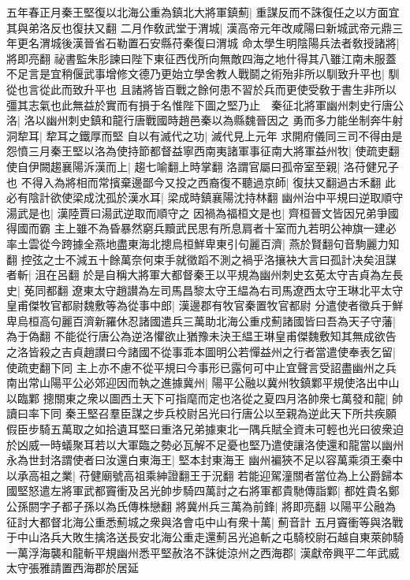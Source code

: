五年春正月秦王堅復以北海公重為鎮北大將軍鎮薊|{
	重謀反而不誅復任之以方面宜其與弟洛反也復扶又翻}
二月作敎武堂于渭城|{
	漢高帝元年改咸陽曰新城武帝元鼎三年更名渭城後漢晉省石勒置石安縣苻秦復曰渭城}
命太學生明陰陽兵法者敎授諸將|{
	將即亮翻}
祕書監朱肜諫曰陛下東征西伐所向無敵四海之地什得其八雖江南未服蓋不足言是宜稍偃武事增修文德乃更始立學舍教人戰鬬之術殆非所以馴致升平也|{
	馴從也言從此而致升平也}
且諸將皆百戰之餘何患不習於兵而更使受敎于書生非所以彊其志氣也此無益於實而有損于名惟陛下圖之堅乃止　秦征北將軍幽州刺史行唐公洛|{
	洛以幽州刺史鎮和龍行唐戰國時趙邑秦以為縣魏晉因之}
勇而多力能坐制奔牛射洞犂耳|{
	犂耳之鐵厚而堅}
自以有滅代之功|{
	滅代見上元年}
求開府儀同三司不得由是怨憤三月秦王堅以洛為使持節都督益寧西南夷諸軍事征南大將軍益州牧|{
	使疏吏翻}
使自伊闕趨襄陽泝漢而上|{
	趨七喻翻上時掌翻}
洛謂官屬曰孤帝室至親|{
	洛苻健兄子也}
不得入為將相而常擯棄邊鄙今又投之西裔復不聽過京師|{
	復扶又翻過古禾翻}
此必有陰計欲使梁成沈孤於漢水耳|{
	梁成時鎮襄陽沈持林翻}
幽州治中平規曰逆取順守湯武是也|{
	漢陸賈曰湯武逆取而順守之}
因禍為福桓文是也|{
	齊桓晉文皆因兄弟爭國得國而霸}
主上雖不為昏暴然窮兵黷武民思有所息肩者十室而九若明公神旗一建必率土雲從今跨據全燕地盡東海北摠烏桓鮮卑東引句麗百濟|{
	燕於賢翻句音駒麗力知翻}
控弦之士不減五十餘萬奈何束手就徵蹈不測之禍乎洛攘袂大言曰孤計决矣沮謀者斬|{
	沮在呂翻}
於是自稱大將軍大都督秦王以平規為幽州刺史玄莬太守吉貞為左長史|{
	莬同都翻}
遼東太守趙讃為左司馬昌黎太守王緼為右司馬遼西太守王琳北平太守皇甫傑牧官都尉魏敷等為從事中郎|{
	漢邊郡有牧官秦置牧官都尉}
分遣使者徵兵于鮮卑烏桓高句麗百濟新羅休忍諸國遣兵三萬助北海公重戍薊諸國皆曰吾為天子守藩|{
	為于偽翻}
不能從行唐公為逆洛懼欲止猶豫未決王緼王琳皇甫傑魏敷知其無成欲告之洛皆殺之吉貞趙讃曰今諸國不從事乖本圖明公若憚益州之行者當遣使奉表乞留|{
	使疏吏翻下同}
主上亦不慮不從平規曰今事形已露何可中止宜聲言受詔盡幽州之兵南出常山陽平公必郊迎因而執之進據冀州|{
	陽平公融以冀州牧鎮鄴平規使洛出中山以臨鄴}
摠關東之衆以圖西土天下可指麾而定也洛從之夏四月洛帥衆七萬發和龍|{
	帥讀曰率下同}
秦王堅召羣臣謀之步兵校尉呂光曰行唐公以至親為逆此天下所共疾願假臣步騎五萬取之如拾遺耳堅曰重洛兄弟據東北一隅兵賦全資未可輕也光曰彼衆迫於凶威一時蟻聚耳若以大軍臨之勢必瓦解不足憂也堅乃遣使讓洛使還和龍當以幽州永為世封洛謂使者曰汝還白東海王|{
	堅本封東海王}
幽州褊狹不足以容萬乘須王秦中以承高祖之業|{
	苻健廟號高祖乘紳證翻王于況翻}
若能迎駕潼關者當位為上公爵歸本國堅怒遣左將軍武都竇衝及呂光帥步騎四萬討之右將軍都貴馳傳詣鄴|{
	都姓貴名鄭公孫閼字子都子孫以為氏傳株戀翻}
將冀州兵三萬為前鋒|{
	將即亮翻}
以陽平公融為征討大都督北海公重悉薊城之衆與洛會屯中山有衆十萬|{
	薊音計}
五月竇衝等與洛戰于中山洛兵大敗生擒洛送長安北海公重走還薊呂光追斬之屯騎校尉石越自東萊帥騎一萬浮海襲和龍斬平規幽州悉平堅赦洛不誅徙涼州之西海郡|{
	漢獻帝興平二年武威太守張雅請置西海郡於居延}


